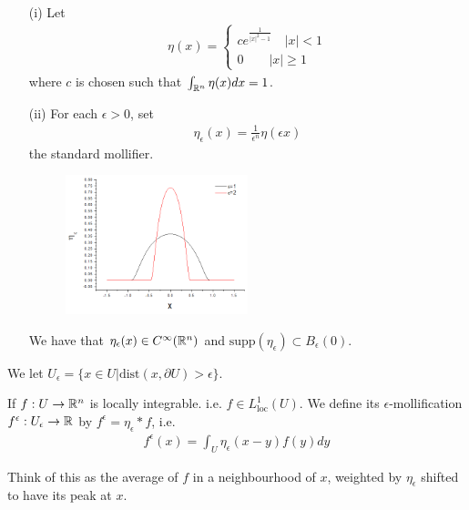 \documentclass[12pt,a4paper]{report}
\begin{document}
 \begin{itemize}
\item[(i)] Let \begin{align*}
\eta(x) = \begin{cases}
c e^{\frac{1}{|x|^2 -1}} \quad |x|<1 \\
0 \quad \quad |x| \geq 1
\end{cases}
\end{align*}
where $c$ is chosen such that $\int_{\mathbb{R}^n} \eta(x) dx =1$.
\item[(ii)] For each $\epsilon >0$, set
\begin{align*}
\eta_{\epsilon}(x) = \frac{1}{\epsilon^n} \eta(\epsilon x)
\end{align*}
the standard mollifier.
\s

\begin{figure}[h]
	\centering
	\includegraphics[width=0.5\textwidth]{kernel}
\end{figure}
\s

We have that $\eta_{\epsilon}(x) \in C^{\infty}(\mathbb{R}^n)$ and $\text{supp}(\eta_{\epsilon}) \subset B_{\epsilon}(0)$.
\end{itemize} 
\s

We let $U_{\epsilon} = \{ x\in U | \text{dist}(x,\partial U) > \epsilon \}$.
\s

 If $f: U\rightarrow \mathbb{R}^n$ is locally integrable. i.e. $f\in L^1_{\text{loc}}(U)$. We define its $\epsilon$-mollification $f^{\epsilon} : U_{\epsilon} \rightarrow \mathbb{R}$ by $f^{\epsilon} = \eta_\epsilon * f$, i.e.
\begin{align*}
f^{\epsilon}(x) = \int_U \eta_{\epsilon}(x-y) f(y)dy
\end{align*}
\s

Think of this as the average of $f$ in a neighbourhood of $x$, weighted by $\eta_{\epsilon}$ shifted to have its peak at $x$.
\s
\end{document}
